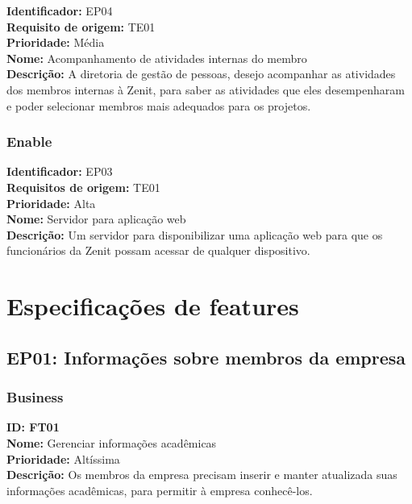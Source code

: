 \begin{anexosenv}
\indent \textbf{Identificador:} EP04\\
\indent \textbf{Requisito de origem:} TE01\\
\indent \textbf{Prioridade:} Média\\
\indent \textbf{Nome:}  Acompanhamento de atividades internas do membro\\
\indent \textbf{Descrição:} A diretoria de gestão de pessoas, desejo acompanhar as atividades dos membros internas à Zenit, para saber as atividades que eles desempenharam e poder selecionar membros mais adequados para os projetos.\\

\subsection[Enable]{Enable}

\indent \textbf{Identificador:} EP03\\
\indent \textbf{Requisitos de origem:} TE01\\
\indent \textbf{Prioridade:} Alta\\
\indent \textbf{Nome:}  Servidor para aplicação web\\
\indent \textbf{Descrição:} Um servidor para disponibilizar uma aplicação web para que os funcionários da Zenit possam acessar de qualquer dispositivo.\\


\chapter{Especificações de features}\label{backlogFeatures}

\section[EP01: Informações sobre membros da empresa]{EP01: Informações sobre membros da empresa}

\subsection[Business]{Business}

\indent \textbf{ID: FT01\\
Nome:} Gerenciar informações acadêmicas\\
\indent \textbf{Prioridade:} Altíssima\\
\indent \textbf{Descrição:} Os membros da empresa precisam inserir e manter atualizada suas informações acadêmicas, para permitir à empresa conhecê-los.\\


\end{anexosenv}
